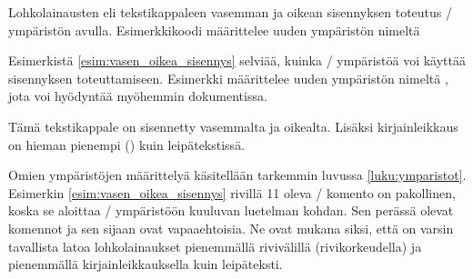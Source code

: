 \begin{esimerkki*}

\begin{koodilohko}
  \newenvironment{lohkolainaus}{%
    \begin{list}{}{
        \setlength{\leftmargin}{1cm}
        \setlength{\rightmargin}{1cm}
        \setlength{\itemindent}{0bp}
        \setlength{\listparindent}{\parindent}
        \setlength{\parsep}{\parskip}
        \setlength{\topsep}{1em}
        \setlength{\partopsep}{0bp}
      }
    \item\linespread{1}\small
    }{\end{list}}
\end{koodilohko}
\caption{Lohkolainausten eli tekstikappaleen vasemman ja oikean
  sisennyksen toteutus \-/ ympäristön avulla.
  Esimerkkikoodi määrittelee uuden ympäristön nimeltä
  }
\label{esim:vasen_oikea_sisennys}
\end{esimerkki*}

Esimerkistä \ref{esim:vasen_oikea_sisennys} selviää, kuinka
\-/ ympäristöä voi käyttää sisennyksen toteuttamiseen.
Esimerkki määrittelee uuden ympäristön nimeltä
, jota voi hyödyntää myöhemmin dokumentissa.

\begin{koodilohkosis}
  \begin{lohkolainaus}
    Tämä tekstikappale on sisennetty vasemmalta ja oikealta. Lisäksi
    kirjainleikkaus on hieman pienempi (\small) kuin leipätekstissä.
  \end{lohkolainaus}
\end{koodilohkosis}

Omien ympäristöjen määrittelyä käsitellään tarkemmin luvussa
\ref{luku:ymparistot}. Esimerkin \ref{esim:vasen_oikea_sisennys} rivillä
11 oleva \-/ komento on pakollinen, koska se aloittaa
\-/ ympäristöön kuuluvan luetelman kohdan. Sen perässä
olevat komennot  ja  sen sijaan ovat
vapaaehtoisia. Ne ovat mukana siksi, että on varsin tavallista latoa
lohkolainaukset pienemmällä rivivälillä (rivikorkeudella) ja pienemmällä
kirjainleikkauksella kuin leipäteksti.

